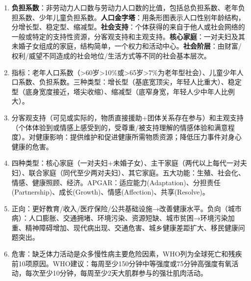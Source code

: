 \begin{enumerate}[leftmargin=*, itemsep=5pt]
    \item \textbf{负担系数}：非劳动力人口数与劳动力人口数的比值，包括总负担系数、老年负担系数、少年儿童负担系数。\textbf{人口金字塔}：用条形图表示人口性别年龄结构，分增长型、稳定型、缩减型。\textbf{社会支持}：个体获得的来自于他人或社会网络的一般或特定的支持性资源，分客观支持和主观支持。\textbf{核心家庭}：一对夫妇及其未婚子女组成的家庭，结构简单，一个权力和活动中心。\textbf{社会阶层}：由财富/权利/威望不同造成的社会地位/生活方式等不同的社会基本层次。
    \item 指标：老年人口系数（>60岁>10\%或>65岁>7\%为老年型社会）、儿童少年人口系数、负担系数。三种类型：增长型（基底宽顶尖，年轻人比重大）、稳定型（底身宽度接近，塔尖收缩）、缩减型（底窄身宽，年轻人少中年人比例大）。
    \item 分客观支持（可见或实际的，物质直接援助+团体关系存在参与）和主观支持（个体体验到或情感上感受到的，受尊重/被支持理解的情感体验和满意程度）。对健康影响：提供维护和促进健康所需物质资源；降低压力事件对身心健康的危害。
    \item 四种类型：核心家庭（一对夫妇+未婚子女）、主干家庭（两代以上每代一对夫妇）、联合家庭（同代至少两对夫妇）、其它家庭。五大功能：生殖、社会化、情感、健康照顾、经济。APGAR：适应能力(Adaptation)、分担责任(Partnership)、成长(Growth)、情感(Affection)、共享(Resolve)。
    \item 正向：更好教育/收入/医疗保险/公共基础设施→改善健康水平。负向（城市病）：人口膨胀、交通拥堵、环境污染、资源短缺、城市贫困→环境污染加重、精神障碍增加、现代病出现、交通危害、城乡健康差距扩大、移民健康问题突出。
    \item 危害：缺乏体力活动是众多慢性病主要危险因素，WHO列为全球死亡和残疾前10项原因。WHO建议：每周至少150分钟中等强度或75分钟高强度有氧活动，每次至少10分钟，每周至少2天大肌群参与的强壮肌肉活动。
\end{enumerate}

\newpage
